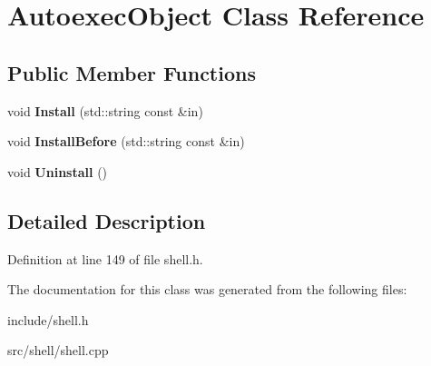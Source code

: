 \hypertarget{classAutoexecObject}{\section{Autoexec\-Object Class Reference}
\label{classAutoexecObject}
}
\subsection*{Public Member Functions}
\begin{DoxyCompactItemize}
\item 
\hypertarget{classAutoexecObject_a30b975e4cf89783c6e56025c60479ca1}{void {\bfseries Install} (std\-::string const \&in)}\label{classAutoexecObject_a30b975e4cf89783c6e56025c60479ca1}

\item 
\hypertarget{classAutoexecObject_a006d09ad8eef5bc34e1d72778a96cce6}{void {\bfseries Install\-Before} (std\-::string const \&in)}\label{classAutoexecObject_a006d09ad8eef5bc34e1d72778a96cce6}

\item 
\hypertarget{classAutoexecObject_a62d93cd9fdbf05b70f05410ae7bb73df}{void {\bfseries Uninstall} ()}\label{classAutoexecObject_a62d93cd9fdbf05b70f05410ae7bb73df}

\end{DoxyCompactItemize}


\subsection{Detailed Description}


Definition at line 149 of file shell.\-h.



The documentation for this class was generated from the following files\-:\begin{DoxyCompactItemize}
\item 
include/shell.\-h\item 
src/shell/shell.\-cpp\end{DoxyCompactItemize}
